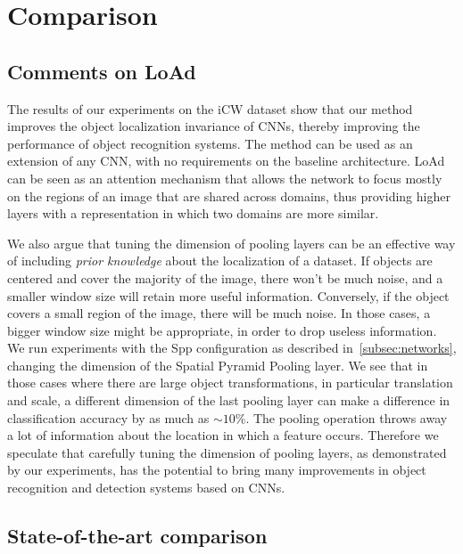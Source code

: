 \documentclass[../main.tex]{subfiles}
\begin{document}
    \chapter{Comparison}\label{chap:comparison}

    \section{Comments on LoAd}\label{sec:load-comments}

    The results of our experiments on the iCW dataset show that our method improves the object localization invariance
    of CNNs, thereby improving the performance of object recognition systems. The method can be used as an extension
    of any CNN, with no requirements on the baseline architecture. LoAd can be seen as an attention mechanism that
    allows the network to focus mostly on the regions of an image that are shared across domains, thus providing higher
    layers with a representation in which two domains are more similar.

    We also argue that tuning the dimension of pooling layers can be an effective way of including \textit{prior knowledge}
    about the localization of a dataset. If objects are centered and cover the majority of the image, there won't be much
    noise, and a smaller window size will retain more useful information. Conversely, if the object covers a small region
    of the image, there will be much noise. In those cases, a bigger window size might be appropriate, in order to drop
    useless information. We run experiments with the Spp configuration as described in~\ref{subsec:networks}, changing the
    dimension of the Spatial Pyramid Pooling layer. We see that in those cases where there are large object transformations,
    in particular translation and scale, a different dimension of the last pooling layer can make a difference in
    classification accuracy by as much as $\sim 10\%$. The pooling operation throws away a lot of information about the location
    in which a feature occurs. Therefore we speculate that carefully tuning the dimension of pooling layers, as demonstrated
    by our experiments, has the potential to bring many improvements in object recognition and detection systems
    based on CNNs.

    \section{State-of-the-art comparison}
\end{document}
